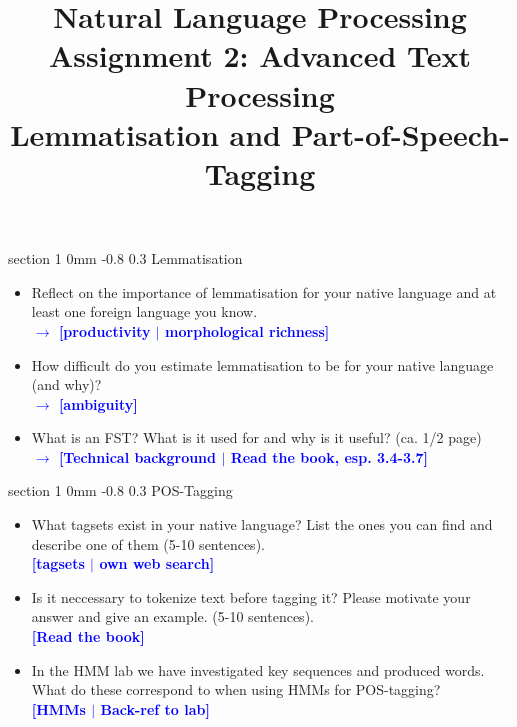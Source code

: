 \documentclass[11pt]{article}
\title{{\LARGE Natural Language Processing}\\[1.5mm]{\large Assignment 2: Advanced Text Processing\\Lemmatisation and Part-of-Speech-Tagging}}
\author{}
\date{} %
\makeatletter
\newcommand{\newsec}[1]{\section{#1}\noindent}
\renewcommand{\section}{\@startsection
{section}%
{1}%
{0mm}%
{-0.8\baselineskip}%
{0.3\baselineskip}%
{\bfseries\large}}%
\makeatother
\begin{document}
 

\maketitle

\newsec{Lemmatisation}%

\begin{itemize}
\item Reflect on the importance of lemmatisation for your native
  language and at least one foreign language you know.\\
  \textbf{\textcolor{blue}{$\rightarrow$ [productivity $|$
      morphological richness]}}
\item How difficult do you estimate lemmatisation to be for your
  native language (and why)? \\\textbf{\textcolor{blue}{$\rightarrow$
      [ambiguity]}}
\item What is an FST? What is it used for and why is it useful? (ca. 1/2 page)\\
  \textbf{\textcolor{blue}{$\rightarrow$ [Technical background $|$
      Read the book, esp. 3.4-3.7]}}
\end{itemize}

\newsec{POS-Tagging}%

\begin{itemize}
\item What tagsets exist in your native language? List the ones you
  can find and describe one of them (5-10
  sentences). \\\textbf{\textcolor{blue}{[tagsets $|$ own web search]}}
\item Is it neccessary to tokenize text before tagging it? Please
  motivate your answer and give an example. (5-10
  sentences). \\\textbf{\textcolor{blue}{[Read the book]}}
\item In the HMM lab we have investigated key sequences and produced
  words. What do these correspond to when using HMMs for POS-tagging?
  \\\textbf{\textcolor{blue}{[HMMs $|$ Back-ref to lab]}}
\end{itemize}
\end{document}
